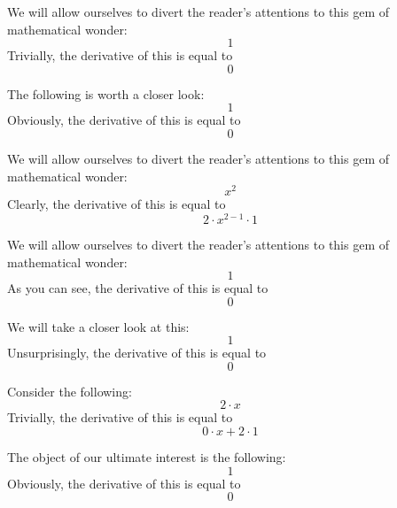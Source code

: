 \documentclass{article}
\begin{document}
We will allow ourselves to divert the reader's attentions to this gem of mathematical wonder:
\begin{equation}
1 
\end{equation}
Trivially, the derivative of this is equal to
\begin{equation}
0 
\end{equation}

The following is worth a closer look:
\begin{equation}
1 
\end{equation}
Obviously, the derivative of this is equal to
\begin{equation}
0 
\end{equation}

We will allow ourselves to divert the reader's attentions to this gem of mathematical wonder:
\begin{equation}
x ^{2 } 
\end{equation}
Clearly, the derivative of this is equal to
\begin{equation}
2 \cdot x ^{2 - 1 } \cdot 1 
\end{equation}

We will allow ourselves to divert the reader's attentions to this gem of mathematical wonder:
\begin{equation}
1 
\end{equation}
As you can see, the derivative of this is equal to
\begin{equation}
0 
\end{equation}

We will take a closer look at this:
\begin{equation}
1 
\end{equation}
Unsurprisingly, the derivative of this is equal to
\begin{equation}
0 
\end{equation}

Consider the following:
\begin{equation}
2 \cdot x 
\end{equation}
Trivially, the derivative of this is equal to
\begin{equation}
0 \cdot x + 2 \cdot 1 
\end{equation}

The object of our ultimate interest is the following:
\begin{equation}
1 
\end{equation}
Obviously, the derivative of this is equal to
\begin{equation}
0 
\end{equation}
\end{document}
